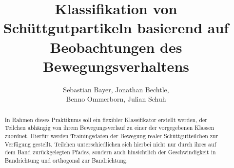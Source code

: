 \documentclass[cover]{isas-seminar}
\title{Klassifikation von Schüttgutpartikeln basierend auf Beobachtungen des Bewegungsverhaltens}
\author{Sebastian Bayer, Jonathan Bechtle,\\ Benno Ommerborn, Julian Schuh}
\begin{document}
\maketitle

\begin{abstract}
In Rahmen dieses Praktikums soll ein flexibler Klassifikator erstellt werden, der Teilchen abhängig von ihrem Bewegungsverlauf zu einer der vorgegebenen Klassen zuordnet. Hierfür werden Trainingsdaten der Bewegung realer Schüttgutteilchen zur Verfügung gestellt. Teilchen unterschiedlichen sich hierbei nicht nur durch ihres auf dem Band zurückgelegten Pfades, sondern auch hinsichtlich der Geschwindigkeit in Bandrichtung und orthogonal zur Bandrichtung.
\end{abstract}
\clearpage
\tableofcontents
\cleardoublepage








\end{document}
